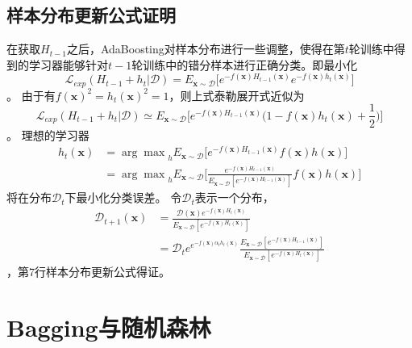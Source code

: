 \subsection*{样本分布更新公式证明}

在获取$H_{t-1}$之后，AdaBoosting对样本分布进行一些调整，使得在第$t$轮训练中得到的学习器能够针对$t-1$轮训练中的错分样本进行正确分类。即最小化
\begin{equation}
\mathcal{L}_{exp}(H_{t-1}+h_t|\mathcal{D})=E_{\mathbf{x}\sim\mathcal{D}}\Big[e^{-f(\mathbf{x})H_{t-1}(\mathbf{x})}e^{-f(\mathbf{x})h_t(\mathbf{x})}\Big]
\end{equation}。
由于有$f(\mathbf{x})^2=h_t(\mathbf{x})^2=1$，则上式泰勒展开式近似为
\begin{equation}
\mathcal{L}_{exp}(H_{t-1}+h_t|\mathcal{D})\simeq E_{\mathbf{x}\sim\mathcal{D}}\Big[e^{-f(\mathbf{x})H_{t-1}(\mathbf{x})}\Big(1-f(\mathbf{x})h_{t}(\mathbf{x})+\frac{1}{2}\Big)\Big]
\end{equation}。
理想的学习器
\begin{equation}\begin{split}
h_t(\mathbf{x})&={\arg\max}_hE_{\mathbf{x}\sim\mathcal{D}}\Big[e^{-f(\mathbf{x})H_{t-1}(\mathbf{x})}f(\mathbf{x})h(\mathbf{x})\Big]\\
&={\arg\max}_hE_{\mathbf{x}\sim\mathcal{D}}\Big[\frac{e^{-f(\mathbf{x})H_{t-1}(\mathbf{x})}}{E_{\mathbf{x}\sim \mathcal{D}}[e^{-f(\mathbf{x})H_{t-1}(\mathbf{x})}]}f(\mathbf{x})h(\mathbf{x})\Big]
\end{split}\end{equation}
将在分布$\mathcal{D}_t$下最小化分类误差。
令$\mathcal{D}_t$表示一个分布，
\begin{equation}\begin{split}
\mathcal{D}_{t+1}(\mathbf{x})&=\frac{\mathcal{D}(\mathbf{x})e^{-f(\mathbf{x})H_t(\mathbf{x})}}{E_{\mathbf{x}\sim\mathcal{D}}[e^{-f(\mathbf{x})H_t(\mathbf{x})}]}\\
&=\mathcal{D}_te^{e^{-f(\mathbf{x})\alpha_t h_t(\mathbf{x})}}\frac{E_{\mathbf{x}\sim\mathcal{D}}[e^{-f(\mathbf{x})H_{t-1}(\mathbf{x})}]}{E_{\mathbf{x}\sim\mathcal{D}}[e^{-f(\mathbf{x})H_t(\mathbf{x})}]}
\end{split}\end{equation}
，第7行样本分布更新公式得证。

\section{Bagging与随机森林}

